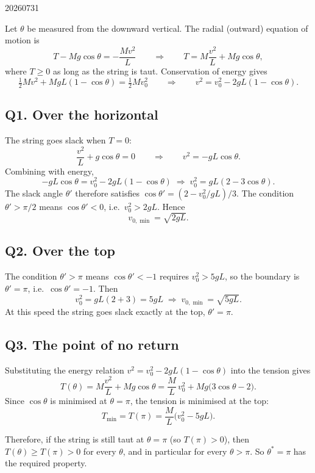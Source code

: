 \begin{solution}{20260731}

Let $\theta$ be measured from the downward vertical.  The radial (outward) equation of motion is
\[
  T - Mg\cos\theta = -\frac{Mv^{2}}{L}
  \qquad\Longrightarrow\qquad
  T = M\frac{v^{2}}{L} + Mg\cos\theta,
\]
where $T \ge 0$ as long as the string is taut.  Conservation of energy gives
\[
  \tfrac12 M v^{2} + MgL(1-\cos\theta) = \tfrac12 M v_{0}^{2}
  \qquad\Longrightarrow\qquad
  v^{2} = v_{0}^{2} - 2gL(1-\cos\theta).
\]

\subsection*{Q1. Over the horizontal}

The string goes slack when $T = 0$:
\[
  \frac{v^{2}}{L} + g\cos\theta = 0
  \qquad\Longrightarrow\qquad
  v^{2} = -gL\cos\theta .
\]
Combining with energy,
\[
  -gL\cos\theta = v_{0}^{2} - 2gL(1-\cos\theta)
  \;\Longrightarrow\;
  v_{0}^{2} = gL(2 - 3\cos\theta).
\]
The slack angle $\theta'$ therefore satisfies $\cos\theta' = (2 - v_{0}^{2}/gL)/3$.  The condition $\theta' > \pi/2$ means $\cos\theta' < 0$, i.e.\ $v_{0}^{2} > 2gL$.  Hence
\[
  \boxed{v_{0,\min} = \sqrt{2gL}}.
\]

\subsection*{Q2. Over the top}

The condition $\theta' > \pi$ means $\cos\theta' < -1$ requires $v_{0}^{2} > 5gL$, so the boundary is $\theta' = \pi$, i.e.\ $\cos\theta' = -1$.  Then
\[
  v_{0}^{2} = gL(2 + 3) = 5gL
  \;\Longrightarrow\;
  \boxed{v_{0,\min} = \sqrt{5gL}}.
\]
At this speed the string goes slack exactly at the top, $\theta' = \pi$.

\subsection*{Q3. The point of no return}

Substituting the energy relation $v^{2} = v_{0}^{2} - 2gL(1-\cos\theta)$ into the tension gives
\[
  T(\theta) = M\frac{v^{2}}{L} + Mg\cos\theta
            = \frac{M}{L}\,v_{0}^{2} + Mg\bigl(3\cos\theta - 2\bigr).
\]
Since $\cos\theta$ is minimised at $\theta = \pi$, the tension is minimised at the top:
\[
  T_{\min} = T(\pi) = \frac{M}{L}\bigl(v_{0}^{2} - 5gL\bigr).
\]

Therefore, if the string is still taut at $\theta = \pi$ (so $T(\pi) > 0$), then $T(\theta) \ge T(\pi) > 0$ for every $\theta$, and in particular for every $\theta > \pi$.  So $\theta^{*} = \pi$ has the required property.


\end{solution}
